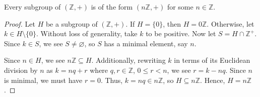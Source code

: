 \begin{prop}
Every subgroup of $ (\mathbb{Z},+) $ is of the form $ (n\mathbb{Z},+) $ for some $ n\in\mathbb{Z} $.
\end{prop}
\begin{proof}
Let $ H $ be a subgroup of $ (\mathbb{Z},+) $. If $ H=\{0\} $, then $ H=0\mathbb{Z} $. Otherwise, let $ k\in H\setminus\{0\} $. Without loss of generality, take $ k $ to be positive. Now let $ S=H\cap\mathbb{Z}^+ $. Since $ k\in S $, we see $ S\neq\varnothing $, so $ S $ has a minimal element, say $ n $.

Since $ n\in H $, we see $ n\mathbb{Z}\subseteq H $. Additionally, rewriting $ k $ in terms of its Euclidean division by $ n $ as $ k=nq+r $ where $ q,r\in\mathbb{Z} $, $ 0\leq r<n $, we see $ r=k-nq $. Since $ n $ is minimal, we must have $ r=0 $. Thus, $ k=nq\in n\mathbb{Z} $, so $ H\subseteq n\mathbb{Z} $. Hence, $ H=n\mathbb{Z} $.
\end{proof}

